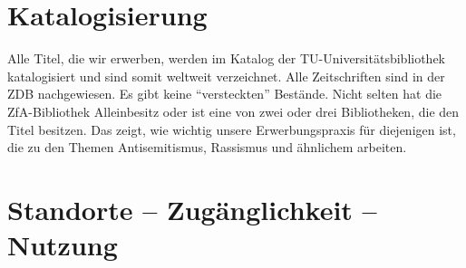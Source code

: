 \documentclass[a4paper,
fontsize=11pt,
oneside,
numbers=noperiodatend,
parskip=half-,
bibliography=totoc,
final
]{scrartcl}
\begin{document}
\hypertarget{katalogisierung}{%
\section{Katalogisierung}\label{katalogisierung}}

Alle Titel, die wir erwerben, werden im Katalog der
TU-Universitätsbibliothek katalogisiert und sind somit weltweit
verzeichnet. Alle Zeitschriften sind in der ZDB nachgewiesen. Es gibt
keine \enquote{versteckten} Bestände. Nicht selten hat die
ZfA-Bibliothek Alleinbesitz oder ist eine von zwei oder drei
Bibliotheken, die den Titel besitzen. Das zeigt, wie wichtig unsere
Erwerbungspraxis für diejenigen ist, die zu den Themen Antisemitismus,
Rassismus und ähnlichem arbeiten.

\hypertarget{standorte-zuguxe4nglichkeit-nutzung}{%
\section{Standorte -- Zugänglichkeit --
Nutzung}\label{standorte-zuguxe4nglichkeit-nutzung}}
\end{document}
